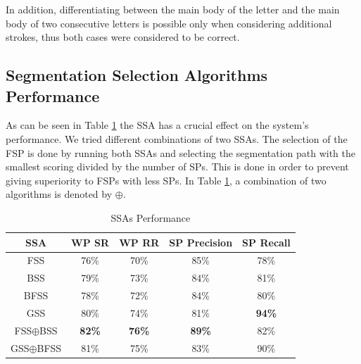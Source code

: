 \documentclass[10pt, conference, compsocconf]{IEEEtran}
\begin{document}
In addition, differentiating between the main body of the letter  and the main body of two consecutive  letters is possible only when considering additional strokes, thus both cases were considered to be correct.\\

\subsection{Segmentation Selection Algorithms Performance}
\label{subsec:ssa_performance}
As can be seen in Table \ref{table:ss_algorithms_results} the SSA has a crucial effect on the system's performance. We tried different combinations of two SSAs. The selection of the FSP is done by running both SSAs and selecting the segmentation path with the smallest scoring divided by the number of SPs. This is done in order to prevent giving superiority to FSPs with less SPs. In Table \ref{table:ss_algorithms_results}, a combination of two algorithms is denoted by $\oplus$.\\

\begin{table}[h]
\caption{SSAs Performance}
\renewcommand{\arraystretch}{1.2}
\begin{tabular}{ | c | c | c | c | c |}
\hline
SSA & WP SR & WP RR & SP Precision & SP Recall\\
\hline                 
  FSS & 76\% & 70\% & 85\% & 78\% \\ 
  \hline
  BSS & 79\% &  73\% & 84\%& 81\% \\
  \hline
  BFSS & 78\% & 72\% & 84\% & 80\%\\ 
  \hline
  GSS & 80\% & 74\% & 81\% & \bf{94}\% \\  
  \hline
  FSS$\oplus$BSS & \bf{82}\% & \bf{76}\% & \bf{89}\% & 82\%\\  
  \hline
  GSS$\oplus$BFSS & 81\% & 75\% & 83\% & 90\% \\
  \hline
\end{tabular}
\centering
\label{table:ss_algorithms_results} 
\end{table}
\end{document}
